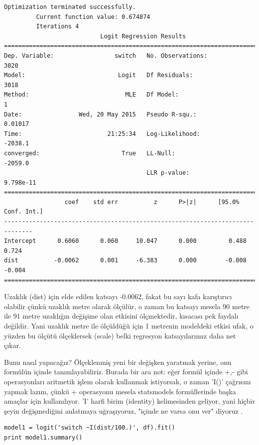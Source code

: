 \documentclass[12pt,fleqn]{article}\usepackage{../../common}
\begin{document}
\begin{verbatim}
Optimization terminated successfully.
         Current function value: 0.674874
         Iterations 4
                           Logit Regression Results                           
==============================================================================
Dep. Variable:                 switch   No. Observations:                 3020
Model:                          Logit   Df Residuals:                     3018
Method:                           MLE   Df Model:                            1
Date:                Wed, 20 May 2015   Pseudo R-squ.:                 0.01017
Time:                        21:25:34   Log-Likelihood:                -2038.1
converged:                       True   LL-Null:                       -2059.0
                                        LLR p-value:                 9.798e-11
==============================================================================
                 coef    std err          z      P>|z|      [95.0% Conf. Int.]
------------------------------------------------------------------------------
Intercept      0.6060      0.060     10.047      0.000         0.488     0.724
dist          -0.0062      0.001     -6.383      0.000        -0.008    -0.004
==============================================================================
\end{verbatim}

Uzaklık (dist) için elde edilen katsayı -0.0062, fakat bu sayı kafa karıştırıcı
olabilir çünkü uzaklık metre olarak ölçülür, o zaman bu katsayı mesela 90 metre
ile 91 metre uzaklığın değişime olan etkisini ölçmektedir, kısacası pek faydalı
değildir. Yani uzaklık metre ile ölçüldüğü için 1 metrenin modeldeki etkisi
ufak, o yüzden bu ölçütü ölçeklersek (scale) belki regresyon katsayılarımız daha
net çıkar.

Bunu nasıl yapacağız?  Ölçeklenmiş yeni bir değişken yaratmak yerine, onu
formülün içinde tanımlayabiliriz.  Burada bir ara not: eğer formül içinde +,-
gibi operasyonları aritmetik işlem olarak kullanmak istiyorsak, o zaman 'I()'
çağrısını yapmak lazım, çünkü + operasyonu mesela statsmodels formüllerinde
başka amaçlar için kullanılıyor. 'I' harfi birim (identity) kelimesinden
geliyor, yani hiçbir şeyin değişmediğini anlatmaya uğraşıyoruz, "içinde ne varsa
onu ver" diyoruz .

\begin{verbatim}
model1 = logit('switch ~I(dist/100.)', df).fit()
print model1.summary()
\end{verbatim}
\end{document}
